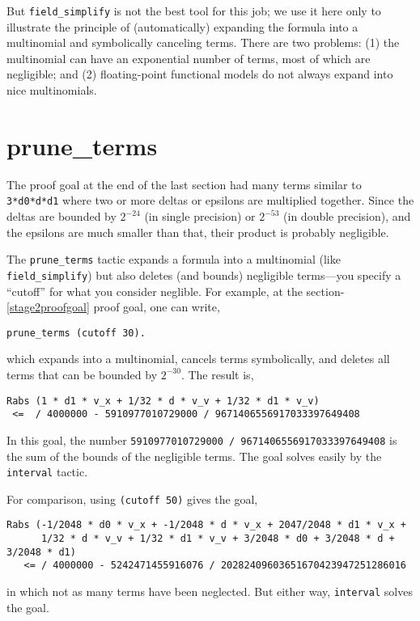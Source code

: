 \documentclass[article]{memoir}
\begin{document}
But \lstinline{field_simplify} is not the best tool for this job;
we use it here only to illustrate the principle of (automatically) expanding the
formula into a multinomial and symbolically canceling terms.
There are two problems: (1) the multinomial can have an exponential number of terms, most of which are negligible; and (2) floating-point functional models do not always expand into nice multinomials.

\chapter{prune\_terms}

The proof goal at the end of the last section had many terms
similar to \lstinline{3*d0*d*d1} where two or more deltas or epsilons
are multiplied together.  Since the deltas are bounded by $2^{-24}$
(in single precision) or $2^{-53}$ (in double precision),
and the epsilons are much smaller than that, their product is
probably negligible.

The \lstinline{prune_terms} tactic expands a formula into a
multinomial (like \lstinline{field_simplify}) but also
deletes (and bounds) negligible terms---you specify
a ``cutoff'' for what you consider neglible.  For example,
at the section-\ref{stage2proofgoal} proof goal,
one can write,

\begin{lstlisting}
prune_terms (cutoff 30).
\end{lstlisting}
which expands into a multinomial, cancels terms symbolically,
and deletes all terms that can be bounded by $2^{-30}$.
The result is,

\begin{lstlisting}
Rabs (1 * d1 * v_x + 1/32 * d * v_v + 1/32 * d1 * v_v)
 <=  / 4000000 - 5910977010729000 / 9671406556917033397649408
\end{lstlisting}
In this goal, the number \lstinline{5910977010729000 / 9671406556917033397649408} is the sum of the bounds of the negligible terms.
The goal solves easily by the \lstinline{interval} tactic.

For comparison, using \lstinline{(cutoff 50)} gives the goal,
\begin{lstlisting}
Rabs (-1/2048 * d0 * v_x + -1/2048 * d * v_x + 2047/2048 * d1 * v_x +
      1/32 * d * v_v + 1/32 * d1 * v_v + 3/2048 * d0 + 3/2048 * d + 3/2048 * d1)
   <= / 4000000 - 5242471455916076 / 20282409603651670423947251286016
\end{lstlisting}
in which not as many terms have been neglected.  But either way,
\lstinline{interval} solves the goal.
\end{document}
